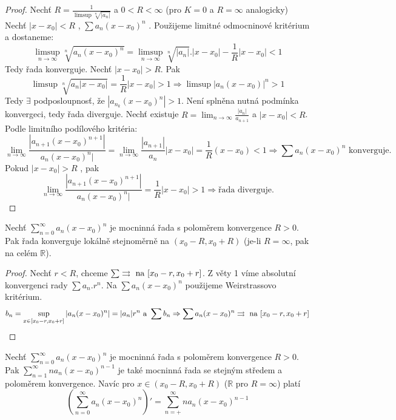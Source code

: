 \begin{proof}
Nechť $R = \frac{1}{\limsup \sqrt[n]{|a_n|}}$ a $0<R<\infty$ (pro $K = 0$ a $R = \infty$ analogicky)
Nechť $|x-x_0| < R$ , $\sum a_n(x-x_0)^n$ . Použijeme limitné odmocninové kritérium a dostaneme:
$$\limsup_{n \to \infty} \sqrt[n]{a_n(x-x_0)^n} = \limsup_{n \to \infty} \sqrt[n]{|a_n|} . |x-x_0| - \frac{1}{R} |x-x_0| < 1$$
Tedy řada konverguje.
Nechť $|x-x_0|>R$. Pak 
$$\limsup \sqrt[n]{a_n|x-x_0|} = \frac{1}{R}|x-x_0| > 1 \Rightarrow \limsup |a_n(x-x_0)|^n > 1$$
Tedy $\exists $ podposloupnosť, že $|a_{n_k} (x-x_0)^n| > 1$. Není splněna nutná podmínka konvergeci, tedy řada diverguje.
Nechť existuje $R = \lim_{n \to \infty } \frac{|a_n|}{a_{n+1}}$ a $|x-x_0|< R$. Podle limitního podílového kritéria:
$$\lim_{n \to \infty} \frac{|a_{n+1}(x-x_0)^{n+1}|}{a_n(x-x_0)^n|} = \lim_{n \to \infty} \frac{|a_{n+1}|}{a_n} |x-x_0| = \frac{1}{R} (x-x_0) < 1 \Rightarrow \sum a_n(x-x_0)^n \textrm{ konverguje.}$$
Pokud $|x-x_0| > R$ , pak 
$$\lim_{n \to \infty} \frac{|a_{n+1}(x-x_0)^{n+1}|}{a_n(x-x_0)^n|} = \frac{1}{R}|x-x_0|>1 \Rightarrow \textrm{řada diverguje.}$$
\end{proof}

\begin{vetal}
Nechť $\sum_{n=0}^{\infty} a_n (x-x_0)^n$ je mocninná řada s poloměrem konvergence $R > 0$.  Pak řada konverguje lokálně stejnoměrně na $(x_0 - R, x_0 + R)$ (je-li $R=\infty$, pak na celém $\mathbb{R}$).
\end{vetal}

\begin{proof}
Nechť $r < R$, chceme $\sum \rightrightarrows \textrm{ na } [x_0-r,x_0+r]$. Z věty 1 víme absolutní konvergenci rady $\sum a_n.r^n$. Na $ \sum a_n(x-x_0)^n$ použijeme Weirstrassovo kritérium.
$$b_n = \sup_{x \in[x_0-r, x_0+r]} |a_n(x-x_0)^n| = |a_n|r^n \textrm{ a } \sum b_n \Rightarrow \sum a_n(x-x_0)^n \rightrightarrows \textrm{ na } [x_0-r, x_0+r]$$
\end{proof}

\begin{vetal}
Nechť $\sum_{n=0}^{\infty} a_n (x-x_0)^n$ je mocninná řada s poloměrem konvergence $R > 0$. Pak $\sum_{n=1}^{\infty} n a_n (x-x_0)^{n-1}$ je také mocninná řada se stejným středem a poloměrem konvergence. Navíc pro $x \in ( x_0 - R, x_0 + R )$ ($\mathbb{R}$ pro $R = \infty$) platí
$$ \left( \sum_{n=0}^{\infty} a_n (x-x_0)^n \right)' = \sum_{n=+}^{\infty} n a_n (x-x_0)^{n-1}$$
\end{vetal}

